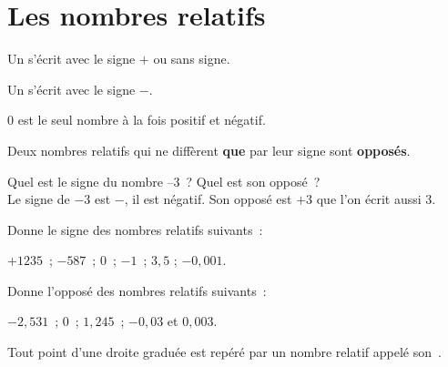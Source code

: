 \section{Les nombres relatifs}


\vspace{4em}

\begin{definition}
Un  s'écrit avec le signe $+$ ou sans signe.

Un  s'écrit avec le signe $-$. 

0 est le seul nombre à la fois positif et négatif.

Deux nombres relatifs qui ne diffèrent \textbf{que} par leur signe sont \textbf{opposés}.
\end{definition}

\vspace{4em}


\begin{methode*1}



\begin{exemple*1}
Quel est le signe du nombre $–3$ ? Quel est son opposé ? \\[1em]
Le signe de $- 3$ est $-$, il est négatif. Son opposé est $+ 3$ que l'on écrit aussi 3.
\end{exemple*1}

\exercice 
Donne le signe des nombres relatifs suivants :

$+1235$ ; $-587$ ; $0$ ; $-1$ ;  $3,5$ ; $-0,001$.

\exercice 
Donne l'opposé des nombres relatifs suivants :

$-2,531$ ; $0$ ; $1,245$ ;  $-0,03$ et $0,003$.

\end{methode*1}


\newpage


\begin{aconnaitre}
Tout point d'une droite graduée est repéré par un nombre relatif appelé son .


\end{aconnaitre}

